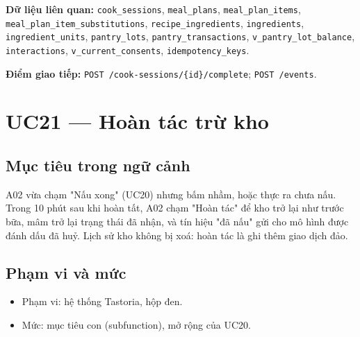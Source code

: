 \textbf{Dữ liệu liên quan:} {\small\texttt{cook\_\allowbreak{}\allowbreak{}sessions}}, {\small\texttt{meal\_\allowbreak{}\allowbreak{}plans}}, {\small\texttt{meal\_\allowbreak{}\allowbreak{}plan\_\allowbreak{}\allowbreak{}items}}, {\small\texttt{meal\_\allowbreak{}\allowbreak{}plan\_\allowbreak{}\allowbreak{}item\_\allowbreak{}\allowbreak{}substitutions}}, {\small\texttt{recipe\_\allowbreak{}\allowbreak{}ingredients}}, {\small\texttt{ingredients}}, {\small\texttt{ingredient\_\allowbreak{}\allowbreak{}units}}, {\small\texttt{pantry\_\allowbreak{}\allowbreak{}lots}}, {\small\texttt{pantry\_\allowbreak{}\allowbreak{}transactions}}, {\small\texttt{v\_\allowbreak{}\allowbreak{}pantry\_\allowbreak{}\allowbreak{}lot\_\allowbreak{}\allowbreak{}balance}}, {\small\texttt{interactions}}, {\small\texttt{v\_\allowbreak{}\allowbreak{}current\_\allowbreak{}\allowbreak{}consents}}, {\small\texttt{idempotency\_\allowbreak{}\allowbreak{}keys}}.

\textbf{Điểm giao tiếp:} {\small\texttt{POST /\allowbreak{}\allowbreak{}cook-\allowbreak{}sessions/\allowbreak{}\allowbreak{}\{id\}/\allowbreak{}\allowbreak{}complete}}; {\small\texttt{POST /\allowbreak{}\allowbreak{}events}}.

\section{UC21 --- Hoàn tác trừ kho}
\subsection{Mục tiêu trong ngữ cảnh}
A02 vừa chạm "Nấu xong" (UC20) nhưng bấm nhầm, hoặc thực ra chưa nấu. Trong 10 phút sau khi hoàn tất, A02 chạm "Hoàn tác" để kho trở lại như trước bữa, mâm trở lại trạng thái đã nhận, và tín hiệu "đã nấu" gửi cho mô hình được đánh dấu đã huỷ. Lịch sử kho không bị xoá: hoàn tác là ghi thêm giao dịch đảo.

\subsection{Phạm vi và mức}
\begin{itemize}
\item Phạm vi: hệ thống Tastoria, hộp đen.
\item Mức: mục tiêu con (subfunction), mở rộng của UC20.
\end{itemize}
